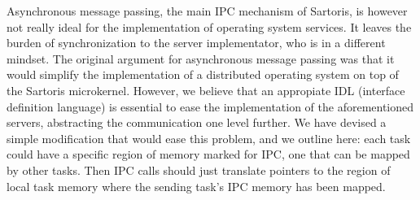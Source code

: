 \documentclass[11pt, letterpaper, twoside, english]{book}
\begin{document}
 Asynchronous message passing, the main IPC mechanism of Sartoris, is however not really ideal for the implementation of operating system services. It leaves the burden of synchronization to the server implementator, who is in a different mindset. The original argument for asynchronous message passing was that it would simplify the implementation of a distributed operating system on top of the Sartoris microkernel. However, we believe that an appropiate IDL (interface definition language) is essential to ease the implementation of the aforementioned servers, abstracting the communication one level further. We have devised a simple modification that would ease this problem, and we outline here: each task could have a specific region of memory marked for IPC, one that can be mapped by other tasks. Then IPC calls should just translate pointers to the region of local task memory where the sending task's IPC memory has been mapped.
\end{document}
